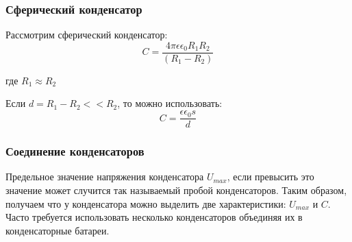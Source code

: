 \documentclass[../main.tex]{subfiles}
\begin{document}
\subsubsection{Сферический конденсатор}
Рассмотрим сферический конденсатор:
\[C = \frac{4 \pi \epsilon \epsilon_0 R_1 R_2}{(R_1 - R_2)}\]
\begin{center}
    где $R_1 \approx R_2$
\end{center}
Если $d = R_1 -R_2 << R_2$, то можно использовать:
\[C = \frac{\epsilon \epsilon_0 s}{d}\]

\subsubsection{Соединение конденсаторов}

Предельное значение напряжения конденсатора $U_{max}$, если превысить это значение может случится так называемый пробой конденсаторов.
Таким образом, получаем что у конденсатора можно выделить две характеристики: $U_{max}$ и $C$. Часто требуется использовать несколько
конденсаторов объединяя их в конденсаторные батареи.
\end{document}
